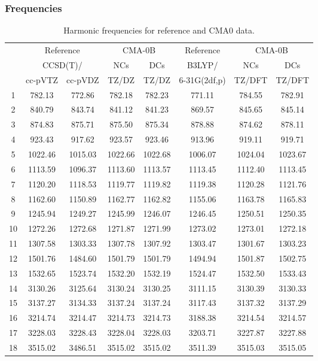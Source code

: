 \documentclass[10pt,oneside]{article}
\begin{document}
\subsubsection*{Frequencies}
\begin{table}[h!]
\centering
\caption{Harmonic frequencies for reference and CMA0 data.}
\begin{tabular}{cccccccc}
\toprule
{} & \multicolumn{2}{c}{Reference} & \multicolumn{2}{c}{CMA-0B} &    Reference & \multicolumn{2}{c}{CMA-0B} \\
{} & \multicolumn{2}{c}{CCSD(T)/} &     NCs &     DCs &       B3LYP/ &     NCs &     DCs \\
{} &   cc-pVTZ & cc-pVDZ &   TZ/DZ &   TZ/DZ & 6-31G(2df,p) &  TZ/DFT &  TZ/DFT \\
\midrule
1  &    782.13 &  772.86 &  782.18 &  782.23 &       771.11 &  784.55 &  782.91 \\
2  &    840.79 &  843.74 &  841.12 &  841.23 &       869.57 &  845.65 &  845.14 \\
3  &    874.83 &  875.71 &  875.50 &  875.34 &       878.88 &  874.62 &  878.11 \\
4  &    923.43 &  917.62 &  923.57 &  923.46 &       913.96 &  919.11 &  919.71 \\
5  &   1022.46 & 1015.03 & 1022.66 & 1022.68 &      1006.07 & 1024.04 & 1023.67 \\
6  &   1113.59 & 1096.37 & 1113.60 & 1113.57 &      1113.45 & 1112.40 & 1113.45 \\
7  &   1120.20 & 1118.53 & 1119.77 & 1119.82 &      1119.38 & 1120.28 & 1121.76 \\
8  &   1162.60 & 1150.89 & 1162.77 & 1162.82 &      1155.06 & 1163.78 & 1165.83 \\
9  &   1245.94 & 1249.27 & 1245.99 & 1246.07 &      1246.45 & 1250.51 & 1250.35 \\
10 &   1272.26 & 1272.68 & 1271.87 & 1271.99 &      1273.02 & 1273.01 & 1272.18 \\
11 &   1307.58 & 1303.33 & 1307.78 & 1307.92 &      1303.47 & 1301.67 & 1303.23 \\
12 &   1501.76 & 1484.60 & 1501.79 & 1501.79 &      1494.94 & 1501.87 & 1502.75 \\
13 &   1532.65 & 1523.74 & 1532.20 & 1532.19 &      1524.47 & 1532.50 & 1533.43 \\
14 &   3130.26 & 3125.64 & 3130.24 & 3130.25 &      3111.15 & 3130.39 & 3130.33 \\
15 &   3137.27 & 3134.33 & 3137.24 & 3137.24 &      3117.43 & 3137.32 & 3137.29 \\
16 &   3214.74 & 3214.47 & 3214.73 & 3214.73 &      3188.38 & 3214.54 & 3214.57 \\
17 &   3228.03 & 3228.43 & 3228.04 & 3228.03 &      3203.71 & 3227.87 & 3227.88 \\
18 &   3515.02 & 3486.51 & 3515.02 & 3515.02 &      3511.39 & 3515.03 & 3515.05 \\
\bottomrule
\end{tabular}
\end{table}
\end{document}
